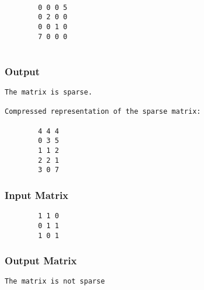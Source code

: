 \documentclass[
]{article}
\begin{document}
\begin{verbatim}
        
        0 0 0 5
        0 2 0 0
        0 0 1 0
        7 0 0 0
        
\end{verbatim}

\hypertarget{output}{%
\subsubsection{Output}\label{output}}

\begin{verbatim}
The matrix is sparse.

Compressed representation of the sparse matrix:

        4 4 4
        0 3 5
        1 1 2
        2 2 1
        3 0 7
\end{verbatim}

\hypertarget{input-matrix-2}{%
\subsubsection{Input Matrix}\label{input-matrix-2}}

\begin{verbatim}
        1 1 0
        0 1 1
        1 0 1
\end{verbatim}

\hypertarget{output-matrix}{%
\subsubsection{Output Matrix}\label{output-matrix}}

\begin{verbatim}
The matrix is not sparse
\end{verbatim}
\end{document}

